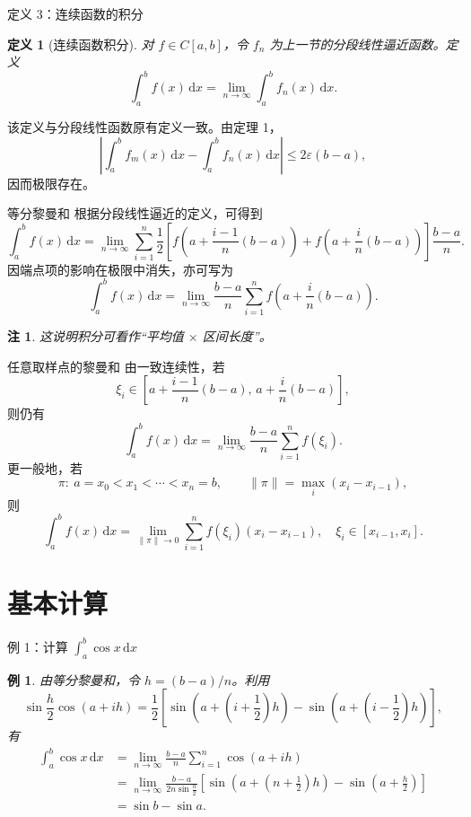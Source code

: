 ﻿\documentclass[aspectratio=169,11pt]{ctexbeamer}
\newtheorem{mydef}{定义}
\newtheorem{myex}{例}
\newtheorem{myrem}{注}
\newcommand{\dd}{\,\mathrm{d}}
\newcommand{\abs}[1]{\left|#1\right|}
\newcommand{\normp}{\lVert\pi\rVert}
\begin{document}
\begin{frame}{定义 3：连续函数的积分}
  \begin{mydef}[连续函数积分]
  对 $f\in C[a,b]$，令 $f_n$ 为上一节的分段线性逼近函数。定义
  \[
    \int_a^b f(x)\dd x
    =\lim_{n\to\infty}\int_a^b f_n(x)\dd x.
  \]
  \end{mydef}

  该定义与分段线性函数原有定义一致。由定理 1，
  \[
    \abs{\int_a^b f_m(x)\dd x-\int_a^b f_n(x)\dd x}
    \le 2\varepsilon(b-a),
  \]
  因而极限存在。
\end{frame}

\begin{frame}{等分黎曼和}
  根据分段线性逼近的定义，可得到
  \[
    \int_a^b f(x)\dd x
    =\lim_{n\to\infty}\sum_{i=1}^{n}
      \frac12\left[
      f\!\left(a+\frac{i-1}{n}(b-a)\right)
      +f\!\left(a+\frac{i}{n}(b-a)\right)\right]\frac{b-a}{n}.
  \]
  因端点项的影响在极限中消失，亦可写为
  \[
    \int_a^b f(x)\dd x
    =\lim_{n\to\infty}\frac{b-a}{n}
      \sum_{i=1}^{n}f\!\left(a+\frac{i}{n}(b-a)\right).
  \]

  \begin{myrem}
  这说明积分可看作“平均值 $\times$ 区间长度”。
  \end{myrem}
\end{frame}

\begin{frame}{任意取样点的黎曼和}
  由一致连续性，若
  \[
    \xi_i\in\left[a+\frac{i-1}{n}(b-a),\,a+\frac{i}{n}(b-a)\right],
  \]
  则仍有
  \[
    \int_a^b f(x)\dd x
    =\lim_{n\to\infty}\frac{b-a}{n}\sum_{i=1}^{n}f(\xi_i).
  \]
  更一般地，若
  \[
    \pi:\ a=x_0<x_1<\cdots<x_n=b,\qquad
    \normp=\max_i(x_i-x_{i-1}),
  \]
  则
  \[
    \int_a^b f(x)\dd x
    =\lim_{\normp\to0}\sum_{i=1}^{n}f(\xi_i)(x_i-x_{i-1}),
    \quad \xi_i\in[x_{i-1},x_i].
  \]
\end{frame}

\section{基本计算}

\begin{frame}{例 1：计算 $\int_a^b\cos x\dd x$}
  \begin{myex}
  由等分黎曼和，令 $h=(b-a)/n$。利用
  \[
    \sin\frac h2\cos(a+ih)
    =\frac12\left[
      \sin\!\left(a+\left(i+\frac12\right)h\right)
      -\sin\!\left(a+\left(i-\frac12\right)h\right)\right],
  \]
  有
  \[
  \begin{aligned}
    \int_a^b\cos x\dd x
    &=\lim_{n\to\infty}\frac{b-a}{n}\sum_{i=1}^{n}\cos(a+ih)\\
    &=\lim_{n\to\infty}
      \frac{b-a}{2n\sin\frac h2}
      \left[\sin\!\left(a+\left(n+\frac12\right)h\right)
      -\sin\!\left(a+\frac h2\right)\right]\\
    &=\sin b-\sin a.
  \end{aligned}
  \]
  \end{myex}
\end{frame}
\end{document}
